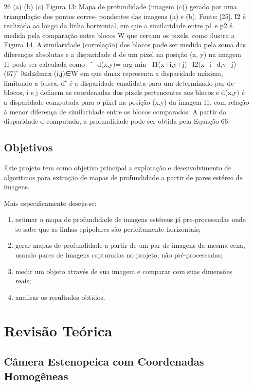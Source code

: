 \documentclass[conference]{IEEEtran}
\begin{document}
  26
   (a) (b) (c)
Figura 13: Mapa de profundidade (imagem (c)) gerado por uma triangulação dos pontos corres- pondentes das imagens (a) e (b). Fonte: [25].
I2 é realizada ao longo da linha horizontal, em que a similaridade entre p1 e p2 é medida pela comparação entre blocos W que cercam os pixels, como ilustra a Figura 14. A similaridade (correlação) dos blocos pode ser medida pela soma das diferenças absolutas e a disparidade d de um pixel na posição (x, y) na imagem I1 pode ser calculada como
􏰆􏰁 ̃􏰁
d(x,y)= arg min 􏰁􏰁I1(x+i,y+j)−I2(x+i−d,y+j)􏰁􏰁 (67)
 ̃
0≤d≤dmax (i,j)∈W
em que dmax representa a disparidade máxima, limitando a busca, d ̃ é a disparidade candidata para um determinado par de blocos, i e j definem as coordenadas dos pixels pertencentes aos blocos e d(x,y) é a disparidade computada para o pixel na posição (x,y) da imagem I1, com relação à menor diferença de similaridade entre os blocos comparados. A partir da disparidade d computada, a profundidade pode ser obtida pela Equação 66.

\subsection{Objetivos}
Este projeto tem como objetivo principal a exploração e desenvolvimento de algoritmos para extração de mapas de profundidade a partir de pares estéreo de imagens.

Mais especificamente deseja-se:
\begin{enumerate}
\item estimar o mapa de profundidade de imagens estéreos já pre-processadas onde se sabe que as linhas epipolares são perfeitamente horizontais;
\item gerar mapas de profundidade a partir de um par de imagens da mesma cena, usando pares de imagens capturadas no projeto, não pré-processadas;
\item medir um objeto através de sua imagem e comparar com suas dimensões reais;
\item analisar os resultados obtidos.
\end{enumerate}
\section{Revisão Teórica}

\subsection{Câmera Estenopeica com Coordenadas Homogêneas}
\end{document}

